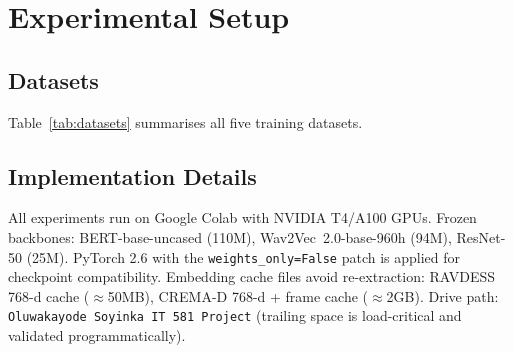 \documentclass[10pt,conference]{IEEEtran}
\theoremstyle{ieeethm}
\theoremstyle{ieeedef}
\theoremstyle{ieeeremark}
\begin{document}
\section{Experimental Setup}
\label{sec:experiments}

\subsection{Datasets}

Table~\ref{tab:datasets} summarises all five training datasets.

\begin{table}[!t]
\centering
\caption{Dataset Summary}
\label{tab:datasets}
\end{table}

\subsection{Implementation Details}

All experiments run on Google Colab with NVIDIA T4/A100 GPUs. Frozen backbones: BERT-base-uncased (110M), Wav2Vec~2.0-base-960h (94M), ResNet-50 (25M). PyTorch 2.6 with the \texttt{weights\_only=False} patch is applied for checkpoint compatibility. Embedding cache files avoid re-extraction: RAVDESS 768-d cache ($\approx$50MB), CREMA-D 768-d + frame cache ($\approx$2GB). Drive path: \texttt{Oluwakayode Soyinka IT 581 Project} (trailing space is load-critical and validated programmatically).
\end{document}
